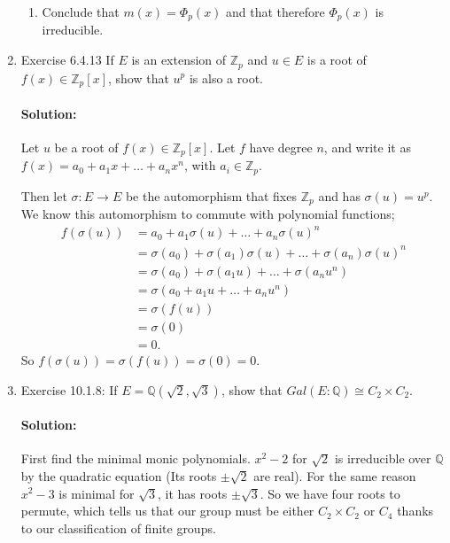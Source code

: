 \documentclass{article}
\begin{document}
\begin{enumerate}
\begin{enumerate}
\item Conclude that $m(x)=\Phi_p(x)$ and that therefore $\Phi_p(x)$ is irreducible.
\end{enumerate}

\item Exercise 6.4.13 If $E$ is an extension of ${\mathbb Z}_p$ and $u\in E$ is a root of $f(x)\in {\mathbb Z}_p[x]$, show that $u^p$ is also a root.
    \paragraph{Solution:} Let $u$ be a root of $f(x)\in \mathbb{Z}_p[x]$. Let $f$ have degree $n$,
    and write it as $f(x)=a_0+a_1x+\ldots+a_nx^{n}$, with $a_i \in \mathbb{Z}_p$.

    Then let $\sigma:E\to E$ be the automorphism that fixes $\mathbb{Z}_p$ and has
    $\sigma(u)=u^{p}$. We know this automorphism to commute with polynomial functions;
    \begin{align*}
        f(\sigma(u))&= a_0+a_1\sigma(u)+\ldots+a_n\sigma(u)^{n}\\
        &=  \sigma(a_0)+\sigma(a_1)\sigma(u)+\ldots+\sigma(a_n)\sigma(u)^{n} \\
        &=  \sigma(a_0)+\sigma(a_1u)+\ldots+\sigma(a_nu^{n}) \\
        &=  \sigma(a_0+a_1u+\ldots+a_nu^{n}) \\
        &=  \sigma(f(u))\\
        &=\sigma(0)\\
        &=0
    .\end{align*}
    So $f(\sigma(u))=\sigma(f(u))=\sigma(0)=0$.
    \newpage

\item Exercise 10.1.8: If $E= {\mathbb Q}(\sqrt{2}, \sqrt{3} )$, show that $Gal(E:{\mathbb Q})\cong C_2\times C_2$.

    \paragraph{Solution:} First find the minimal monic polynomials. $x^2-2$ for $\sqrt{2} $ is 
    irreducible over $\mathbb{Q}$ by the quadratic equation (Its roots $\pm \sqrt{2} $ are real). For the 
    same reason $x^2-3$ is minimal for $\sqrt{3}$, it has roots $\pm\sqrt{3} $. So we have 
    four roots to permute, which tells us that our group must be either $C_2\times C_2$ or $C_4$ thanks
    to our classification of finite groups.


\end{enumerate}
\end{document}

